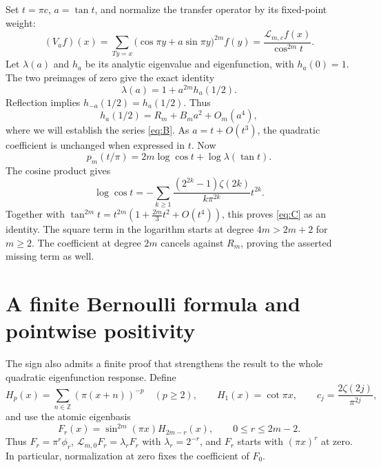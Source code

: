\documentclass[11pt,a4paper]{article}
\theoremstyle{remark}\newtheorem*{ednote}{Editorial note (ProveIt, 2026-10-01)}
\newcommand{\Z}{\mathbb Z}\newcommand{\T}{\mathbb T}\newcommand{\E}{\mathcal E}
\newcommand{\Lop}{\mathcal L}\newcommand{\ii}{\mathrm i}
\begin{document}
Set $t=\pi c$, $a=\tan t$, and normalize the transfer operator by its fixed-point weight:
\begin{equation}\label{eq:V}
 (V_af)(x)=\sum_{Ty=x}\bigl(\cos\pi y+a\sin\pi y\bigr)^{2m}f(y)
       =\frac{\Lop_{m,c}f(x)}{\cos^{2m}t}.
\end{equation}
Let $\lambda(a)$ and $h_a$ be its analytic eigenvalue and eigenfunction, with $h_a(0)=1$. The two preimages of zero give the exact identity
\begin{equation}\label{eq:feedback}
 \lambda(a)=1+a^{2m}h_a(1/2).
\end{equation}
Reflection implies $h_{-a}(1/2)=h_a(1/2)$. Thus
\[
 h_a(1/2)=R_m+B_ma^2+O_m(a^4),
\]
where we will establish the series \eqref{eq:B}. As $a=t+O(t^3)$, the quadratic coefficient is unchanged when expressed in $t$. Now
\[
 p_m(t/\pi)=2m\log\cos t+\log\lambda(\tan t).
\]
The cosine product gives
\[
 \log\cos t=-\sum_{k\ge1}
 \frac{(2^{2k}-1)\zeta(2k)}{k\pi^{2k}}t^{2k}.
\]
Together with $\tan^{2m}t=t^{2m}(1+\frac{2m}{3}t^2+O(t^4))$, this proves \eqref{eq:C} as an identity. The square term in the logarithm starts at degree $4m>2m+2$ for $m\ge2$. The coefficient at degree $2m$ cancels against $R_m$, proving the asserted missing term as well.

\section{A finite Bernoulli formula and pointwise positivity}\label{sec:finitebasis}
The sign also admits a finite proof that strengthens the result to the whole quadratic eigenfunction response. Define
\[
 H_p(x)=\sum_{n\in\Z}(\pi(x+n))^{-p}\quad(p\ge2),\qquad
 H_1(x)=\cot\pi x,\qquad c_j=\frac{2\zeta(2j)}{\pi^{2j}},
\]
and use the atomic eigenbasis
\[
 F_r(x)=\sin^{2m}(\pi x)H_{2m-r}(x),\qquad0\le r\le2m-2.
\]
Thus $F_r=\pi^r\phi_r$, $\Lop_{m,0}F_r=\lambda_rF_r$ with $\lambda_r=2^{-r}$, and $F_r$ starts with $(\pi x)^r$ at zero. In particular, normalization at zero fixes the coefficient of $F_0$.
\end{document}
